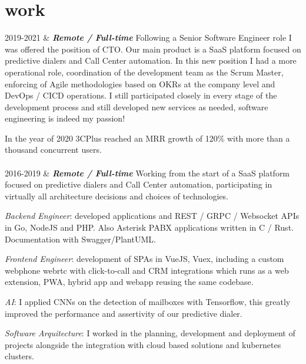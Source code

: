 \documentclass[]{cv-mauri}
\begin{document}
\section*{work}
\begin{tabularcv}
    2019-2021   &   
                    \textbf{\textit{Remote / Full-time}}
                    \newline
		    Following a Senior Software Engineer role I was offered the position of CTO. Our main product is a SaaS platform focused on predictive dialers and Call Center automation. In this new position I had a more operational role, coordination of the development team as the Scrum Master, enforcing of Agile methodologies based on OKRs at the company level and DevOps / CICD operations. I still participated closely in every stage of the development process and still developed new services as needed, software engineering is indeed my passion!
		    
		    In the year of 2020 3CPlus reached an MRR growth of 120\% with more than a thousand concurrent users.
                    \\[\vspacepar]
                    \\[\vspacepar]
    2016-2019   &   
		    		\textbf{\textit{Remote / Full-time}}
		    		\newline
		    Working from the start of a SaaS platform focused on predictive dialers and Call Center automation, participating in virtually all architecture decisions and choices of technologies.
		    
		    \textit{Backend Engineer}: developed applications and REST / GRPC / Websocket APIs in Go, NodeJS and PHP. Also Asterisk PABX applications written in C / Rust. Documentation with Swagger/PlantUML.
		    
		    \textit{Frontend Engineer}: development of SPAs in VueJS, Vuex, including a custom webphone webrtc with click-to-call and CRM integrations which runs as a web extension, PWA, hybrid app and webapp reusing the same codebase.
		    
		    \textit{AI}: I applied CNNs on the detection of mailboxes with Tensorflow, this greatly improved the performance and assertivity of our predictive dialer.
		    
		    \textit{Software Arquitecture}: I worked in the planning, development and deployment of projects alongside the integration with cloud based solutions and kubernetes clusters.
		    

\end{tabularcv}
\end{document}
